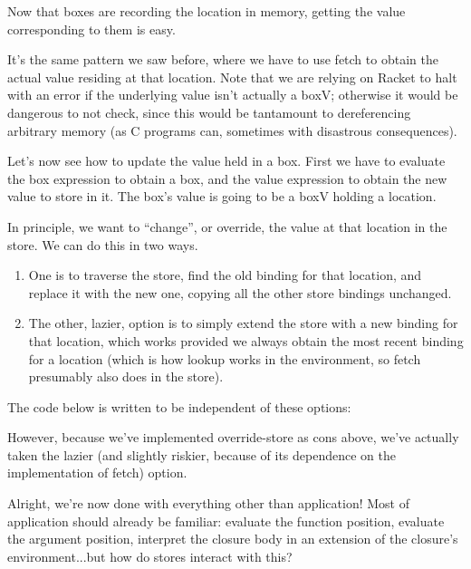 Now that boxes are recording the location in memory, getting the value
corresponding to them is easy.

It’s the same pattern we saw before, where we have to use fetch to obtain the
actual value residing at that location. Note that we are relying on Racket to
halt with an error if the underlying value isn’t actually a boxV; otherwise it
would be dangerous to not check, since this would be tantamount to dereferencing
arbitrary memory (as C programs can, sometimes with disastrous consequences).

Let’s now see how to update the value held in a box. First we have to evaluate
the box expression to obtain a box, and the value expression to obtain the new
value to store in it. The box’s value is going to be a boxV holding a location.

In principle, we want to “change”, or override, the value at that location in
the store. We can do this in two ways.
\begin{enumerate}[nosep]
  \item 
One is to traverse the store, find the old binding for that location, and
replace it with the new one, copying all the other store bindings unchanged.
  \item 
The other, lazier, option is to simply extend the store with a new binding for
that location, which works provided we always obtain the most recent binding for
a location (which is how lookup works in the environment, so fetch presumably
also does in the store).
\end{enumerate}

The code below is written to be independent of these options:

However, because we’ve implemented override-store as cons above, we’ve actually
taken the lazier (and slightly riskier, because of its dependence on the
implementation of fetch) option.

Alright, we’re now done with everything other than application! Most of
application should already be familiar: evaluate the function position, evaluate
the argument position, interpret the closure body in an extension of the
closure’s environment...but how do stores interact with this?

